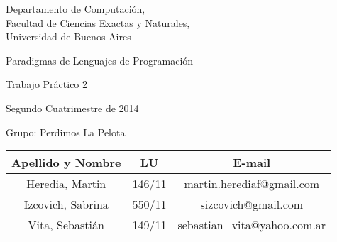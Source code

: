 \documentclass[10pt, a4paper]{article}
\author{Paradigmas de Lenguajes de Programación, DC, UBA.}
\date{}
\begin{document}
	
\thispagestyle{caratula}

\begin{center}

\vspace{2cm}

Departamento de Computación,\\
Facultad de Ciencias Exactas y Naturales,\\
Universidad de Buenos Aires

\vspace{4cm}

\begin{Huge}
Paradigmas de Lenguajes de Programación
\end{Huge}

\vspace{0.5cm}

\begin{huge}
Trabajo Práctico 2
\end{huge}

\vspace{1cm}

Segundo Cuatrimestre de 2014

\vspace{4cm}


\begin{Large}
Grupo: Perdimos La Pelota
\end{Large}

\vspace{1cm}

\begin{tabular}{|c|c|c|}
\hline
Apellido y Nombre & LU & E-mail\\
\hline
Heredia, Martin        & 146/11 & martin.herediaf@gmail.com\\
Izcovich, Sabrina      & 550/11 & sizcovich@gmail.com\\
Vita, Sebastián        & 149/11 & sebastian\_vita@yahoo.com.ar\\
\hline
\end{tabular}

\end{center}

\newpage

\small

\end{document}

